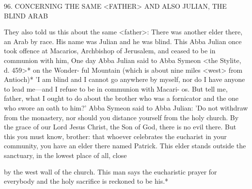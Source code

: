 96.
CONCERNING THE SAME <FATHER> AND
ALSO JULIAN, THE BLIND ARAB

They also told us this about the same <father>: There was another
elder there, an Arab by race.
His name was Julian and he was blind.
This Abba Julian once took offence at Macarios, Archbishop of
Jerusalem, and ceased to be in communion with him, One day Abba
Julian said to Abba Symeon <the Stylite, d.
459>* on the Wonder-
ful Mountain (which is about nine miles <west> from Antioch)* 'I
am blind and I cannot go anywhere by myself, nor do I have
anyone to lead me—and I refuse to be in communion with Macari-
os.
But tell me, father, what I ought to do about the brother who
was a fornicator and the one who swore an oath to him?' Abba
Symeon said to Abba Julian: 'Do not withdraw from the monastery,
nor should you distance yourself from the holy church.
By the grace
of our Lord Jesus Christ, the Son of God, there is no evil there.
But
this you must know, brother: that whoever celebrates the eucharist
in your community, you have an elder there named Patrick.
This
elder stands outside the sanctuary, in the lowest place of all, close

by the west wall of the church.
This man says the eucharistic prayer
for everybody and the holy sacrifice is reckoned to be his.*

